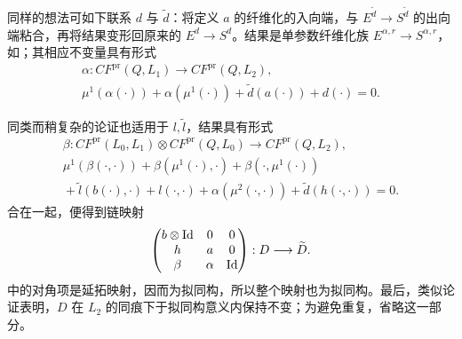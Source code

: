 同样的想法可如下联系 $d$ 与 $\tilde d$：将定义 $a$ 的纤维化的入向端，与 $E^{\tilde d}\to S^{\tilde d}$ 的出向端粘合，再将结果变形回原来的 $E^d\to S^d$。结果是单参数纤维化族 $E^{\alpha,r}\to S^{\alpha,r}$，如；其相应不变量具有形式
\[
\boxed{\begin{gathered}
\alpha:CF^{\mathrm{pr}}(Q,L_1)\longrightarrow CF^{\mathrm{pr}}(Q,L_2),\\
\mu^1(\alpha(\cdot))+\alpha(\mu^1(\cdot))+\tilde d(a(\cdot))+d(\cdot)=0.
\end{gathered}}
\]

同类而稍复杂的论证也适用于 $l,\tilde l$，结果具有形式
\[
\boxed{\begin{gathered}
\beta:CF^{\mathrm{pr}}(L_0,L_1)\otimes CF^{\mathrm{pr}}(Q,L_0)\longrightarrow CF^{\mathrm{pr}}(Q,L_2),\\
\mu^1(\beta(\cdot,\cdot))+\beta(\mu^1(\cdot),\cdot)+\beta(\cdot,\mu^1(\cdot))\\
{}+\tilde l(b(\cdot),\cdot)+l(\cdot,\cdot)+\alpha(\mu^2(\cdot,\cdot))
+\tilde d(h(\cdot,\cdot))=0.
\end{gathered}}
\]
合在一起，便得到链映射
\begin{equation}\label{eq:17.18}
\begin{pmatrix}
b\otimes\operatorname{Id}&0&0\\h&a&0\\\beta&\alpha&\operatorname{Id}
\end{pmatrix}:D\longrightarrow\widetilde D.
\end{equation}
中的对角项是延拓映射，因而为拟同构，所以整个映射也为拟同构。最后，类似论证表明，$D$ 在 $L_2$ 的同痕下于拟同构意义内保持不变；为避免重复，省略这一部分。
